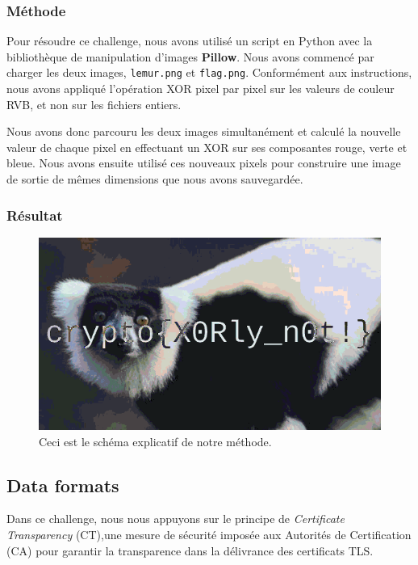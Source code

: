\subsubsection{Méthode}
Pour résoudre ce challenge, nous avons utilisé un script en Python avec la
bibliothèque de manipulation d'images \textbf{Pillow}. Nous avons commencé
par charger les deux images, \texttt{lemur.png} et \texttt{flag.png}.
Conformément aux instructions, nous avons appliqué l'opération XOR pixel
par pixel sur les valeurs de couleur RVB, et non sur les fichiers
entiers.

Nous avons donc parcouru les deux images simultanément et calculé la
nouvelle valeur de chaque pixel en effectuant un XOR sur ses composantes
rouge, verte et bleue. Nous avons ensuite utilisé ces nouveaux pixels
pour construire une image de sortie de mêmes dimensions que nous avons
sauvegardée.

\subsubsection{Résultat}
\begin{figure}[H]
    \centering
    \includegraphics[width=0.8\linewidth]{Images/Lemur/xored_result.png}

    \caption{Ceci est le schéma explicatif de notre méthode.}

    \label{fig:encodeChallRes}
\end{figure}

\subsection{Data formats}

Dans ce challenge, nous nous appuyons sur le principe de \emph{Certificate Transparency} (CT),une mesure de sécurité imposée aux Autorités de Certification (CA) pour garantir la transparence dans la délivrance des certificats TLS.

